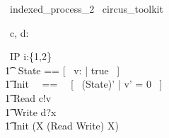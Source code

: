 \begin{zsection}
  \SECTION\ indexed\_process\_2 \parents\ circus\_toolkit
\end{zsection}

\begin{circus}
	\circchannel\ c, d: \nat \\
\end{circus}

\begin{circus}
    \circprocess\ IP \circdef i:\{1,2\} \circindex \circbegin \\
        \t1 \circstate\ State == [~ v: \nat | true ~] \\
        \t1 Init ~~==~~ [~ (State)' | v' = 0 ~] \\
        \t1 Read \circdef c!v \then \Skip \\
        \t1 Write \circdef d?x \then \Skip \\
        \t1 \circspot \lschexpract Init \rschexpract \circseq (\circmu X \circspot (Read \extchoice Write) \circseq X) \\ 
	\circend
\end{circus}
